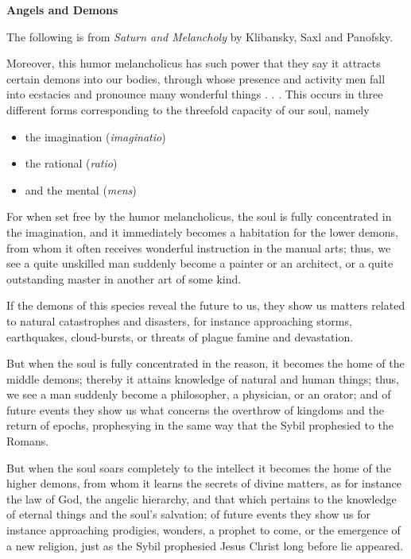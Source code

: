 \textbf{Angels and Demons}


The following is from \emph{Saturn and Melancholy} by Klibansky, Saxl and Panofsky.

\begin{quotationx}
Moreover, this humor melancholicus has such power that they say it attracts certain demons into our bodies, through whose presence and activity men fall into ecstacies and pronounce many wonderful things . . . This occurs in three different forms corresponding to the threefold capacity of our soul, namely

\begin{itemize}


\item the imagination (\emph{imaginatio})

\item the rational (\emph{ratio})

\item and the mental (\emph{mens})
\end{itemize}

For when set free by the humor melancholicus, the soul is fully concentrated in the imagination, and it immediately becomes a habitation for the lower demons, from whom it often receives wonderful instruction in the manual arts; thus, we see a quite unskilled man suddenly become a painter or an architect, or a quite outstanding master in another art of some kind.

If the demons of this species reveal the future to us, they show us matters related to natural catastrophes and disasters, for instance approaching storms, earthquakes, cloud-bursts, or threats of plague famine and devastation.

But when the soul is fully concentrated in the reason, it becomes the home of the middle demons; thereby it attains knowledge of natural and human things; thus, we see a man suddenly become a philosopher, a physician, or an orator; and of future events they show us what concerns the overthrow of kingdoms and the return of epochs, prophesying in the same way that the Sybil prophesied to the Romans.

But when the soul soars completely to the intellect it becomes the home of the higher demons, from whom it learns the secrets of divine matters, as for instance the law of God, the angelic hierarchy, and that which pertains to the knowledge of eternal things and the soul's salvation; of future events they show us for instance approaching prodigies, wonders, a prophet to come, or the emergence of a new religion, just as the Sybil prophesied Jesus Christ long before lie appeared.
\end{quotationx}


